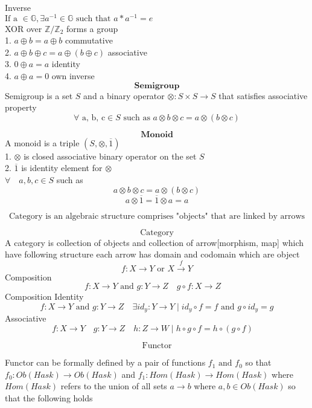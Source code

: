 \documentclass{book}
\begin{document}
Inverse\\
$ \text{If a } \in \mathbb{G}, \exists a^{-1} \in \mathbb{G} \text{ such that } a*a^{-1} = e $\\

XOR over $\mathbb{Z}/\mathbb{Z}_2$ forms a group\\
1. $ a \oplus b = a \oplus b $ commutative\\ 
2. $ a \oplus b \oplus c = a \oplus (b \oplus c) $ associative\\ 
3. $ 0 \oplus a = a $ identity\\ 
4. $ a \oplus a = 0 $ own inverse\\  

\[ \textbf{ Semigroup } \]
Semigroup is a set $S$ and a binary operator $\otimes \colon S \times S \rightarrow S$ that satisfies 
associative property\\ 
\[ \forall \text{ a, b, c} \in S \text{ such as } a \otimes b\otimes c = a \otimes (b \otimes c) \]

\[ \textbf{ Monoid } \]
A monoid is a triple $(S, \otimes, \overline{1})$ \\
1. $\otimes$ is closed associative binary operator on the set $S$ \\
2. $\overline{1}$ is identity element for $\otimes$ \\
$\forall\quad a, b, c \in S$ such as\\
\[ a \otimes b  \otimes c = a \otimes (b \otimes c)   \]
\[ a \otimes \overline{1} = \overline{1} \otimes a =  a  \]

\newpage
\[ \text{Category is an algebraic structure comprises "objects" that are linked by arrows} \] 

\[ \text{ Category } \]
A category is collection of objects and collection of arrow[morphism, map] which have following structure
each arrow has domain and codomain which are object     
\[ f \colon X \rightarrow Y \text{ or } X \xrightarrow{f} Y\]
Composition
\[ f \colon X \rightarrow Y \text{ and } g \colon Y \rightarrow Z \quad g \circ f \colon X \rightarrow Z \quad \]
Composition Identity
\[ f \colon X \rightarrow Y \text{ and } g \colon Y \rightarrow Z  \quad \exists id_y \colon Y \rightarrow Y \mid id_y \circ f = f \text{ and } g \circ id_y = g \]
Associative
\[ f \colon X \rightarrow Y \quad g \colon Y \rightarrow Z \quad h \colon Z \rightarrow W \mid h \circ g \circ f = h \circ (g \circ f) \quad \]

\[ \text{Functor} \]

Functor can be formally defined by a pair of functions $f_1 \mbox{ and } f_0$ 
so that $f_0:Ob(Hask) \rightarrow Ob(Hask)$ and $f_1:Hom(Hask) \rightarrow Hom(Hask)$
where $Hom(Hask)$ refers to the union of all sets $a \rightarrow b$ where $a, b \in Ob(Hask)$
so that the following holds \\
\end{document}
